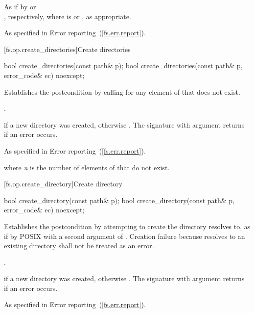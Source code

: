 \begin{itemdescr}
\pnum
\effects As if by
 or\\
, respectively,
  where  is  or
  , as appropriate.

\pnum
\throws As specified in Error reporting~(\ref{fs.err.report}).
\end{itemdescr}


[fs.op.create_directories]{Create directories}

%
\begin{itemdecl}
bool create_directories(const path& p);
bool create_directories(const path& p, error_code& ec) noexcept;
\end{itemdecl}

\begin{itemdescr}
\pnum
\effects Establishes the postcondition by calling  for any element of  that does not
  exist.

\pnum
\postcondition {}.

\pnum
\returns {} if a new directory was created, otherwise . The signature with argument  returns  if an
  error occurs.

\pnum
\throws As specified in Error reporting~(\ref{fs.err.report}).

\pnum
\complexity {} where \textit{n} is the number of elements
  of  that do not exist.
\end{itemdescr}


[fs.op.create_directory]{Create directory}

%
\begin{itemdecl}
bool create_directory(const path& p);
bool create_directory(const path& p, error_code& ec) noexcept;
\end{itemdecl}

\begin{itemdescr}
\pnum
\effects Establishes the postcondition by attempting to create the
  directory  resolves to, as if by POSIX  with a second argument of
  . Creation
  failure because  resolves to an existing directory shall not be
  treated as an error.

\pnum
\postcondition {}.

\pnum
\returns {} if a new directory was created, otherwise .
  The signature with argument  returns  if an error occurs.

\pnum
\throws As specified in Error reporting~(\ref{fs.err.report}).
\end{itemdescr}

